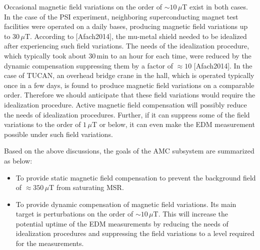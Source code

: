 Occasional magnetic field variations on the order of $\sim 10\,\mu$T exist in both cases. In the case of the PSI experiment, neighboring superconducting magnet test facilities were operated on a daily bases, producing magnetic field variations up to $30\,\mu$T. According to [Afach2014], the mu-metal shield needed to be idealized after experiencing such field variations. The needs of the idealization procedure, which typically took about 30\,min to an hour for each time, were reduced by the dynamic compensation suppressing them by a factor of $\approx10$ [Afach2014]. In the case of TUCAN, an overhead bridge crane in the hall, which is operated typically once in a few days, is found to produce magnetic field variations on a comparable order. Therefore we should anticipate that these field variations would require the idealization procedure. Active magnetic field compensation will possibly reduce the needs of idealization procedures. Further, if it can suppress some of the field variations to the order of $1\,\mu$T or below, it can even make the EDM measurement possible under such field variations.

Based on the above discussions, the goals of the AMC subsystem are summarized as below:
\begin{itemize}
  \item To provide static magnetic field compensation to prevent the background field of $\approx 350\,\mu$T from saturating MSR. 
  \item To provide dynamic compensation of magnetic field variations. Its main target is perturbations on the order of $\sim 10\,\mu$T. This will increase the potential uptime of the EDM measurements by reducing the needs of idealization procedures and suppressing the field variations to a level required for the measurements.
\end{itemize}

